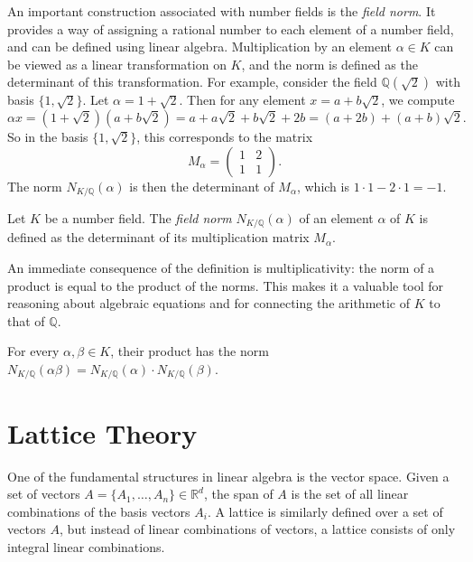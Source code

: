 An important construction associated with number fields is the \emph{field norm}.
It provides a way of assigning a rational number to each element of a number field,
and can be defined using linear algebra.
Multiplication by an element $α ∈ K$ can be viewed as a linear transformation on $K$,
and the norm is defined as the determinant of this transformation.
For example, consider the field $ℚ(\sqrt{2})$ with basis $\{1, \sqrt{2}\}$.
Let $α = 1 + \sqrt{2}$.
Then for any element $x = a + b \sqrt{2}$, we compute
\[
  αx = (1 + \sqrt{2})(a + b \sqrt{2}) = a + a \sqrt{2} + b \sqrt{2} + 2b = (a + 2b) + (a + b)\sqrt{2}.
\]
So in the basis $\{1, \sqrt{2}\}$, this corresponds to the matrix
\[
  M_α =
  \begin{pmatrix}
    1 & 2 \\
    1 & 1
  \end{pmatrix}.
\]
The norm $N_{K/ℚ}(α)$ is then the determinant of $M_α$, which is $1 \cdot 1 - 2 \cdot 1 = -1$.

\begin{definition}
  Let $K$ be a number field.
  The \emph{field norm} $N_{K/ℚ}(α)$ of an element $α$ of $K$ is defined as the
  determinant of its multiplication matrix $M_α$.
\end{definition}

An immediate consequence of the definition is multiplicativity:
the norm of a product is equal to the product of the norms.
This makes it a valuable tool for reasoning about algebraic equations
and for connecting the arithmetic of $K$ to that of $ℚ$.

\begin{lemma}
  For every $α, β ∈ K$, their product has the norm $N_{K/ℚ}(αβ) = N_{K/ℚ}(α) · N_{K/ℚ}(β)$.
\end{lemma}

\section{Lattice Theory}

One of the fundamental structures in linear algebra is the vector space.
Given a set of vectors $A = \{A_1, …, A_n\} ∈ ℝ^d$, the span of $A$ is the set
of all linear combinations of the basis vectors $A_i$.
A lattice is similarly defined over a set of vectors $A$, but instead of linear
combinations of vectors, a lattice consists of only integral linear
combinations.

